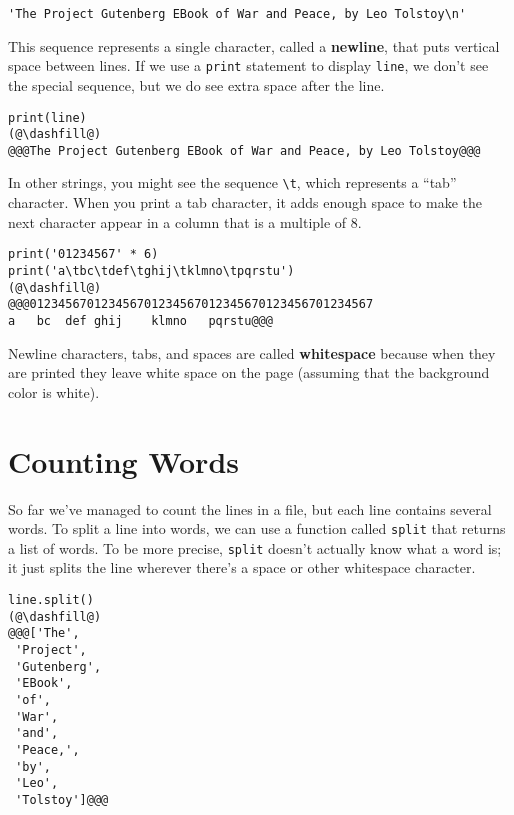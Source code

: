 \begin{lstlisting}
'The Project Gutenberg EBook of War and Peace, by Leo Tolstoy\n'
\end{lstlisting}

This sequence represents a single character, called a \textbf{newline},
that puts vertical space between lines. If we use a
\passthrough{\lstinline!print!} statement to display
\passthrough{\lstinline!line!}, we don't see the special sequence, but
we do see extra space after the line.

\begin{lstlisting}[]
print(line)
(@\dashfill@)
@@@The Project Gutenberg EBook of War and Peace, by Leo Tolstoy@@@
\end{lstlisting}

In other strings, you might see the sequence
\passthrough{\lstinline!\\t!}, which represents a ``tab'' character.
When you print a tab character, it adds enough space to make the next
character appear in a column that is a multiple of 8.

\begin{lstlisting}[]
print('01234567' * 6)
print('a\tbc\tdef\tghij\tklmno\tpqrstu')
(@\dashfill@)
@@@012345670123456701234567012345670123456701234567
a   bc  def ghij    klmno   pqrstu@@@
\end{lstlisting}

Newline characters, tabs, and spaces are called \textbf{whitespace}
because when they are printed they leave white space on the page
(assuming that the background color is white).

\hypertarget{counting-words}{%
\section{Counting Words}\label{counting-words}}

So far we've managed to count the lines in a file, but each line
contains several words. To split a line into words, we can use a
function called \passthrough{\lstinline!split!} that returns a list of
words. To be more precise, \passthrough{\lstinline!split!} doesn't
actually know what a word is; it just splits the line wherever there's a
space or other whitespace character.

\begin{lstlisting}[]
line.split()
(@\dashfill@)
@@@['The',
 'Project',
 'Gutenberg',
 'EBook',
 'of',
 'War',
 'and',
 'Peace,',
 'by',
 'Leo',
 'Tolstoy']@@@
\end{lstlisting}

